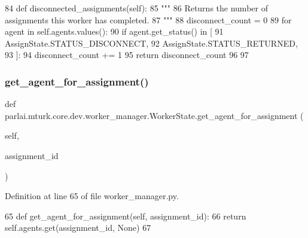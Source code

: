 \begin{DoxyCode}
84     \textcolor{keyword}{def }disconnected\_assignments(self):
85         \textcolor{stringliteral}{"""}
86 \textcolor{stringliteral}{        Returns the number of assignments this worker has completed.}
87 \textcolor{stringliteral}{        """}
88         disconnect\_count = 0
89         \textcolor{keywordflow}{for} agent \textcolor{keywordflow}{in} self.agents.values():
90             \textcolor{keywordflow}{if} agent.get\_status() \textcolor{keywordflow}{in} [
91                 AssignState.STATUS\_DISCONNECT,
92                 AssignState.STATUS\_RETURNED,
93             ]:
94                 disconnect\_count += 1
95         \textcolor{keywordflow}{return} disconnect\_count
96 
97 
\end{DoxyCode}
\mbox{\label{classparlai_1_1mturk_1_1core_1_1dev_1_1worker__manager_1_1WorkerState_a39acee8124982d290385f35365a72051}} 
\subsubsection{\texorpdfstring{get\+\_\+agent\+\_\+for\+\_\+assignment()}{get\_agent\_for\_assignment()}}
{\footnotesize\ttfamily def parlai.\+mturk.\+core.\+dev.\+worker\+\_\+manager.\+Worker\+State.\+get\+\_\+agent\+\_\+for\+\_\+assignment (\begin{DoxyParamCaption}\item[{}]{self,  }\item[{}]{assignment\+\_\+id }\end{DoxyParamCaption})}



Definition at line 65 of file worker\+\_\+manager.\+py.


\begin{DoxyCode}
65     \textcolor{keyword}{def }get\_agent\_for\_assignment(self, assignment\_id):
66         \textcolor{keywordflow}{return} self.agents.get(assignment\_id, \textcolor{keywordtype}{None})
67 
\end{DoxyCode}
\mbox{\label{classparlai_1_1mturk_1_1core_1_1dev_1_1worker__manager_1_1WorkerState_a739a3208abd2d6d674694e1d6aebc292}} 
